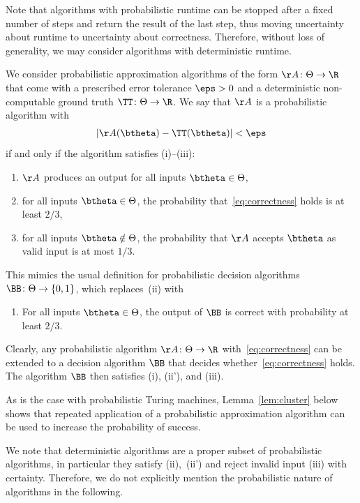 \documentclass{amsart}[11pt]
\numberwithin{equation}{section}
\numberwithin{theorem}{section}
\begin{document}
Note that algorithms with probabilistic runtime can be stopped after a fixed number of steps and return the result of the last step, thus moving uncertainty about runtime to uncertainty about correctness. Therefore, without loss of generality, we may consider algorithms with 
deterministic runtime.

We consider  probabilistic approximation algorithms of the form $\AA\colon  \Theta \to \R$ that come with a prescribed error tolerance $\eps>0$ and a deterministic non-computable ground truth $\TT\colon \Theta \to \R$.
We say that $\AA$ is a probabilistic algorithm with
\begin{align}\label{eq:correctness}
|\AA(\btheta) - \TT(\btheta)|<\eps
\end{align}
if and only if the algorithm satisfies (i)--(iii):
\begin{enumerate}[label=(\roman*)]
    \item\label{item:probabilistic_time_one} $\AA$ produces an output for all inputs $\btheta \in \Theta$, 
    \item\label{item:probabilistic_time_two} for all inputs $\btheta\in \Theta$, the probability that~\eqref{eq:correctness} holds is at least $2/3$,
    \item\label{item:probabilistic_time_three} for all inputs $\btheta\notin \Theta $, the probability that $\AA$ accepts $\btheta$ as valid input is at most $1/3$. 
\end{enumerate}
This mimics the usual definition for probabilistic decision algorithms $\BB\colon \Theta \to \{0,1\}$, which replaces~(ii) with
\begin{enumerate}
    \item[(ii')] For all inputs $\btheta\in \Theta$, the output of $\BB$ is correct with probability at least $2/3$.
\end{enumerate}
Clearly, any probabilistic algorithm $\AA\colon \Theta\to \R$ with~\eqref{eq:correctness} can be extended to a decision algorithm $\BB$ that decides whether~\eqref{eq:correctness} holds. The algorithm $\BB$ then satisfies (i), (ii'), and (iii).

As is the case with probabilistic Turing machines, Lemma~\ref{lem:cluster} below shows that repeated application of a probabilistic approximation algorithm can be used to increase the probability of success.

We note that deterministic algorithms are a proper subset of probabilistic algorithms, in particular they satisfy (ii),~(ii') and reject invalid input (iii) with certainty. Therefore, we do not explicitly mention the probabilistic nature of algorithms in the following.
\end{document}
